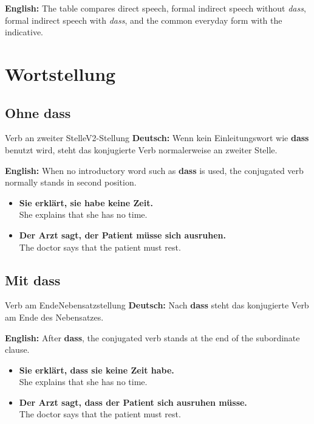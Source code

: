 \documentclass[a4paper,11pt]{article}
\newcommand{\GermanText}[1]{\textbf{Deutsch: }#1\par}
\newcommand{\EnglishText}[1]{{\small\color{SoftGray}\textbf{English: }#1\par}}
\newcommand{\ExampleItem}[2]{\item \textbf{#1}\\{\small\color{SoftGray}#2}}
\begin{document}
        \EnglishText{The table compares direct speech, formal indirect speech without \textit{dass}, formal indirect speech with \textit{dass}, and the common everyday form with the indicative.}


    \section{Wortstellung}

        \subsection{Ohne \glqq dass\grqq}

            \begin{grammarentry}{Verb an zweiter Stelle}{V2-Stellung}
                \GermanText{Wenn kein Einleitungswort wie \textbf{dass} benutzt wird, steht das konjugierte Verb normalerweise an zweiter Stelle.}
                \EnglishText{When no introductory word such as \textbf{dass} is used, the conjugated verb normally stands in second position.}
            \end{grammarentry}

            \begin{exbox}
                \begin{itemize}
                    \ExampleItem{Sie erklärt, sie habe keine Zeit.}{She explains that she has no time.}
                    \ExampleItem{Der Arzt sagt, der Patient müsse sich ausruhen.}{The doctor says that the patient must rest.}
                \end{itemize}
            \end{exbox}

        \subsection{Mit \glqq dass\grqq}

            \begin{grammarentry}{Verb am Ende}{Nebensatzstellung}
                \GermanText{Nach \textbf{dass} steht das konjugierte Verb am Ende des Nebensatzes.}
                \EnglishText{After \textbf{dass}, the conjugated verb stands at the end of the subordinate clause.}
            \end{grammarentry}

            \begin{exbox}
                \begin{itemize}
                    \ExampleItem{Sie erklärt, dass sie keine Zeit habe.}{She explains that she has no time.}
                    \ExampleItem{Der Arzt sagt, dass der Patient sich ausruhen müsse.}{The doctor says that the patient must rest.}
                \end{itemize}
            \end{exbox}
\end{document}
